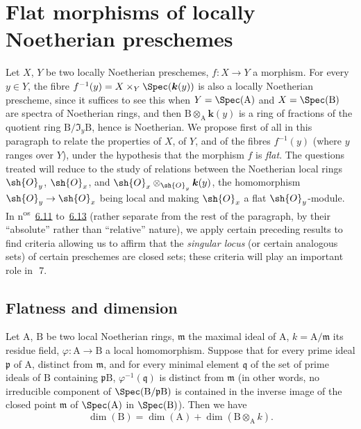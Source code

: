 \section{Flat morphisms of locally Noetherian preschemes}
\label{section:IV.6}

Let $X$, $Y$ be two locally Noetherian preschemes, $f:X\to Y$ a morphism.
For every $y\in Y$, the fibre $f^{-1}(y)=X\times_Y\Spec(\boldsymbol{k}(y))$ is also a locally Noetherian prescheme, since it suffices to see this when $Y=\Spec(\mathrm{A})$ and $X=\Spec(\mathrm{B})$ are spectra of Noetherian rings, and then $\mathrm{B}\otimes_\mathrm{A}\boldsymbol{k}(y)$ is a ring of fractions of the quotient ring $\mathrm{B}/\mathfrak{I}_y\mathrm{B}$, hence is Noetherian.
We propose first of all in this paragraph to relate the properties of $X$, of $Y$, and of the fibres $f^{-1}(y)$ (where $y$ ranges over $Y$), under the hypothesis that the morphism $f$ is \emph{flat}.
The questions treated will reduce to the study of relations between the Noetherian local rings $\sh{O}_y$, $\sh{O}_x$, and $\sh{O}_x\otimes_{\sh{O}_y}\boldsymbol{k}(y)$, the homomorphism $\sh{O}_y\to\sh{O}_x$ being local and making $\sh{O}_x$ a flat $\sh{O}_y$-module.
In n\textsuperscript{os}~{\hyperlink{ega4.c04.subsec.6-11}{6.11}}
to~{\hyperlink{ega4.c04.subsec.6-13}{6.13}} (rather separate from the rest of the paragraph, by their ``absolute'' rather than ``relative'' nature), we apply certain preceding results to find criteria allowing us to affirm that the \emph{singular locus} (or certain analogous sets) of certain preschemes are closed sets; these criteria will play an important role in~\textsection\,7.

\subsection{Flatness and dimension}
\label{subsection:IV.6.1}

\begin{proposition}[6.1.1]
\label{IV.6.1.1}
Let $\mathrm{A}$, $\mathrm{B}$ be two local Noetherian rings, $\mathfrak{m}$ the maximal ideal of $\mathrm{A}$, $k=\mathrm{A}/\mathfrak{m}$ its residue field, $\varphi:\mathrm{A}\to\mathrm{B}$ a local homomorphism.
Suppose that for every prime ideal $\mathfrak{p}$ of $\mathrm{A}$, distinct from $\mathfrak{m}$, and for every minimal element $\mathfrak{q}$ of the set of prime ideals of $\mathrm{B}$ containing $\mathfrak{p}\mathrm{B}$, $\varphi^{-1}(\mathfrak{q})$ is distinct from $\mathfrak{m}$ (in other words, no irreducible component of $\Spec(\mathrm{B}/\mathfrak{p}\mathrm{B})$ is contained in the inverse image of the closed point $\mathfrak{m}$ of $\Spec(\mathrm{A})$ in $\Spec(\mathrm{B})$).
Then we have
\begin{equation}
  \dim(\mathrm{B})=\dim(\mathrm{A})+\dim(\mathrm{B}\otimes_\mathrm{A} k).
  \tag{6.1.1.1}
\label{IV.6.1.1.1}
\end{equation}
\end{proposition}

